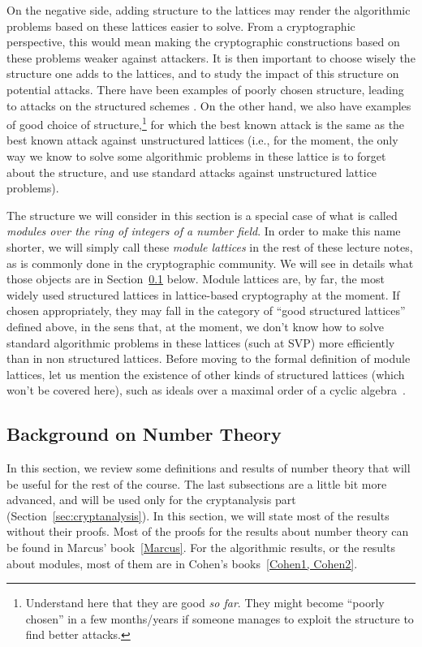 On the negative side, adding structure to the lattices may render the algorithmic problems based on these lattices easier to solve. From a cryptographic perspective, this would mean making the cryptographic constructions based on these problems weaker against attackers. It is then important to choose wisely the structure one adds to the lattices, and to study the impact of this structure on potential attacks.
There have been examples of poorly chosen structure, leading to attacks on the structured schemes \cite{BLA}.
On the other hand, we also have examples of good choice of structure,\footnote{Understand here that they are good \emph{so far}. They might become ``poorly chosen'' in a few months/years if someone manages to exploit the structure to find better attacks.} for which the best known attack is the same as the best known attack against unstructured lattices (i.e., for the moment, the only way we know to solve some algorithmic problems in these lattice is to forget about the structure, and use standard attacks against unstructured lattice problems).

The structure we will consider in this section is a special case of what is called \emph{modules over the ring of integers of a number field}. In order to make this name shorter, we will simply call these \emph{module lattices} in the rest of these lecture notes, as is commonly done in the cryptographic community. We will see in details what those objects are in Section~\ref{sec:number-theory} below. Module lattices are, by far, the most widely used structured lattices in lattice-based cryptography at the moment. If chosen appropriately, they may fall in the category of ``good structured lattices'' defined above, in the sens that, at the moment, we don't know how to solve standard algorithmic problems in these lattices (such at SVP) more efficiently than in non structured lattices.
Before moving to the formal definition of module lattices, let us mention the existence of other kinds of structured lattices (which won't be covered here), such as ideals over a maximal order of a cyclic algebra~\cite{CLWE}.


\subsection{Background on Number Theory}
\label{sec:number-theory}
In this section, we review some definitions and results of number theory that will be useful for the rest of the course. The last subsections are a little bit more advanced, and will be used only for the cryptanalysis part (Section~\ref{sec:cryptanalysis}). In this section, we will state most of the results without their proofs. Most of the proofs for the results about number theory can be found in Marcus' book~\ref{Marcus}. For the algorithmic results, or the results about modules, most of them are in Cohen's books~\ref{Cohen1, Cohen2}.
